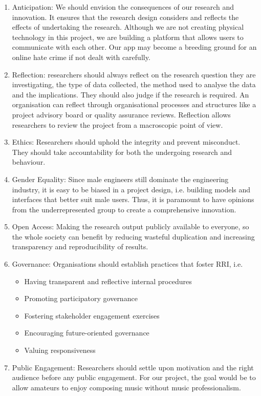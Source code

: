 \begin{enumerate}
    \item Anticipation: We should envision the consequences of our research and innovation. It ensures that the research design considers and reflects the effects of undertaking the research. Although we are not creating physical technology in this project, we are building a platform that allows users to communicate with each other. Our app may become a breeding 
        ground for an online hate crime if not dealt with carefully.
    \item Reflection: researchers should always reflect on the research question they are investigating, the type of data collected, the method used to analyse the data and the implications.
    They should also judge if the research is required. An organisation can reflect through organisational processes and structures like a project advisory board or quality assurance reviews. Reflection 
    allows researchers to review the project from a macroscopic point of view.
    \item Ethics: Researchers should uphold the integrity and prevent misconduct. They should take accountability for both the undergoing research and behaviour.
    \item Gender Equality: Since male engineers still dominate the engineering industry, it is easy to be biased in a project design, i.e. building models and interfaces that better suit male users. Thus, it is 
    paramount to have opinions from the underrepresented group to create a comprehensive innovation.
    \item Open Access: Making the research output publicly available to everyone, so the whole society can benefit by reducing wasteful duplication and increasing transparency and reproducibility of results.
    \item Governance: Organisations should establish practices that foster RRI, i.e. 
    \begin{itemize}
        \item Having transparent and reflective internal procedures
        \item Promoting participatory governance
        \item Fostering stakeholder engagement exercises
        \item Encouraging future-oriented governance
        \item Valuing responsiveness
    \end{itemize}
    \item Public Engagement: Researchers should settle upon motivation and the right audience before any public engagement. For our project, the goal would be to allow amateurs to enjoy composing music without
    music professionalism.
\end{enumerate}
